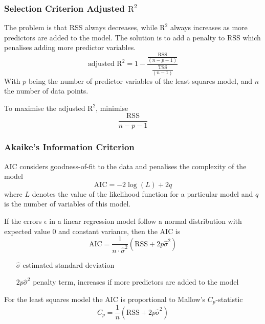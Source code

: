 \documentclass[11pt]{article}
\theoremstyle{definition}
\begin{document}
\subsubsection{Selection Criterion Adjusted $\text{R}^2$}
The problem is that RSS always decreases, while $\text{R}^2$ always increases as more predictors are added to the model. The solution is to add a penalty to RSS which penalises adding more predictor variables.
\begin{equation*}
	\text{adjusted R}^2 = 1 - \frac{\frac{\text{RSS}}{(n-p-1)}}{\frac{\text{TSS}}{(n-1)}}
\end{equation*}
With $p$ being the number of predictor variables of the least squares model, and $n$ the number of data points.

To maximise the adjusted $\text{R}^2$, minimise
\begin{equation*}
	\frac{\text{RSS}}{n-p-1}
\end{equation*}

\subsubsection{Akaike's Information Criterion}
AIC considers goodness-of-fit to the data and penalises the complexity of the model
\begin{equation*}
	\text{AIC} = -2\log(L) + 2q
\end{equation*}
where $L$ denotes the value of the likelihood function for a particular model and $q$ is the number of variables of this model.

If the errors $\epsilon$ in a linear regression model follow a normal distribution with expected value $0$ and constant variance, then the AIC is
\begin{equation*}
	\text{AIC} = \frac{1}{n\cdot \hat{\sigma}^2} \left(\text{RSS} + 2p\hat{\sigma}^2\right)
\end{equation*}
\begin{itemize}[leftmargin=*, labelindent=1cm, labelsep=1cm]
	\item[$\hat{\sigma}$] estimated standard deviation
	\item[$2p\hat{\sigma}^2$] penalty term, increases if more predictors are added to the model
\end{itemize}
For the least squares model the AIC is proportional to Mallow's $C_p$-statistic
\begin{equation*}
	C_p = \frac{1}{n} (\text{RSS} + 2p\hat{\sigma}^2)
\end{equation*}
\end{document}
